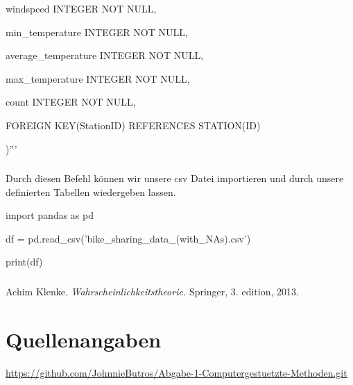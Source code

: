\documentclass{article}
\begin{document}
windspeed INTEGER NOT NULL,
 
 min\_temperature INTEGER NOT NULL,
 
average\_temperature INTEGER NOT NULL,
 
 max\_temperature INTEGER NOT NULL,
 
 count INTEGER NOT NULL,
  
 FOREIGN KEY(StationID) REFERENCES STATION(ID)

)'''


\subsubsection{}

Durch diesen Befehl können wir unsere csv Datei importieren und durch unsere definierten Tabellen wiedergeben lassen.

import pandas as pd

df = pd.read\_csv('bike\_sharing\_data\_(with\_NAs).csv')

print(df)

\subsubsection{}

\newpage
\renewcommand{\refname}{Literatur}
\begin{thebibliography}{9}
 Achim Klenke. \emph{Wahrscheinlichkeitstheorie.} Springer, 3. edition, 2013.
\end{thebibliography}

\newpage
\section{Quellenangaben}

\url{https://github.com/JohnnieButros/Abgabe-1-Computergestuetzte-Methoden.git}
\end{document}
